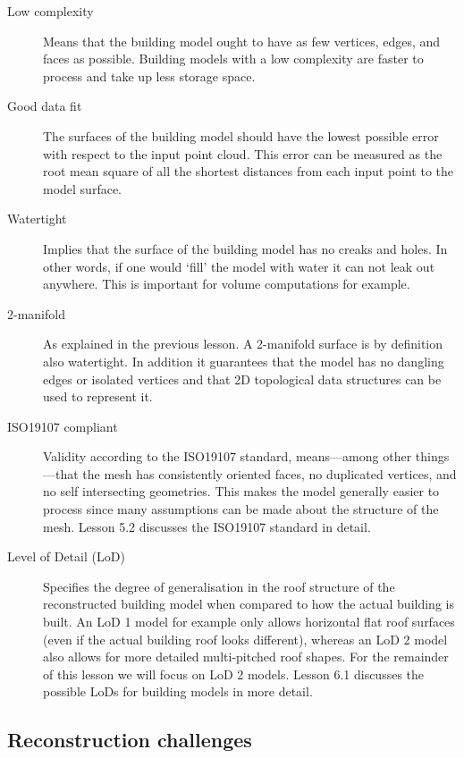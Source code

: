 \begin{description}
	\item[Low complexity] Means that the building model ought to have as few vertices, edges, and faces as possible. Building models with a low complexity are faster to process and take up less storage space.
	\item[Good data fit] The surfaces of the building model should have the lowest possible error with respect to the input point cloud. This error can be measured as the root mean square of all the shortest distances from each input point to the model surface. 
	\item[Watertight] Implies that the surface of the building model has no creaks and holes. In other words, if one would `fill' the model with water it can not leak out anywhere. This is important for volume computations for example. 
	\item[2-manifold] As explained in the previous lesson. A 2-manifold surface is by definition also watertight. In addition it guarantees that the model has no dangling edges or isolated vertices and that 2D topological data structures can be used to represent it.
	\item[ISO19107 compliant] Validity according to the ISO19107 standard, means---among other things---that the mesh has consistently oriented faces, no duplicated vertices, and no self intersecting geometries. This makes the model generally easier to process since many assumptions can be made about the structure of the mesh. Lesson 5.2 discusses the ISO19107 standard in detail.
	\item[Level of Detail (LoD)] Specifies the degree of generalisation in the roof structure of the reconstructed building model when compared to how the actual building is built. An LoD 1 model for example only allows horizontal flat roof surfaces (even if the actual building roof looks different), whereas an LoD 2 model also allows for more detailed multi-pitched roof shapes. For the remainder of this lesson we will focus on LoD 2 models. Lesson 6.1 discusses the possible LoDs for building models in more detail.
\end{description}

\subsection{Reconstruction challenges}

